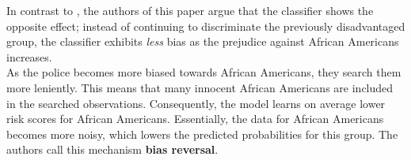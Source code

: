 
In contrast to \cite{kallus2018}, the authors of this paper argue that the classifier shows the opposite effect; instead of continuing to discriminate the previously disadvantaged group, the classifier exhibits \textit{less} bias as the prejudice against African Americans increases.\\
As the police becomes more biased towards African Americans, they search them more leniently. This means that many innocent African Americans are included in the searched observations. Consequently, the model learns on average lower risk scores for African Americans. Essentially, the data for African Americans becomes more noisy, which lowers the predicted probabilities for this group. The authors call this mechanism \textbf{bias reversal}.\\

